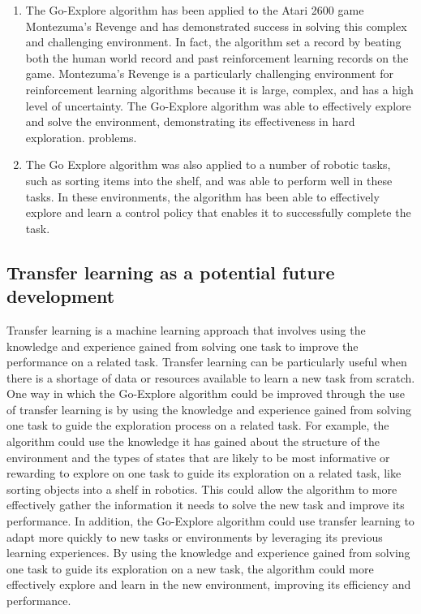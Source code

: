 \documentclass[runningheads]{llncs}%
\begin{document}
\begin{enumerate}
\item The Go-Explore algorithm has been applied to the Atari 2600 game Montezuma's Revenge and has demonstrated success in solving this complex and challenging environment. In fact, the algorithm set a record by beating both the human world record and past reinforcement learning records on the game. Montezuma's Revenge is a particularly challenging environment for reinforcement learning algorithms because it is large, complex, and has a high level of uncertainty. The Go-Explore algorithm was able to effectively explore and solve the environment, demonstrating its effectiveness in hard exploration. problems. 

\item The Go Explore algorithm was also applied to a number of robotic tasks, such as sorting items into the shelf, and was able to perform well in these tasks. In these environments, the algorithm has been able to effectively explore and learn a control policy that enables it to successfully complete the task.

\end{enumerate}

\subsection{ Transfer learning as a potential future development }
Transfer learning is a machine learning approach that involves using the knowledge and experience gained from solving one task to improve the performance on a related task. Transfer learning can be particularly useful when there is a shortage of data or resources available to learn a new task from scratch.\\

One way in which the Go-Explore algorithm could be improved through the use of transfer learning is by using the knowledge and experience gained from solving one task to guide the exploration process on a related task. For example, the algorithm could use the knowledge it has gained about the structure of the environment and the types of states that are likely to be most informative or rewarding to explore on one task to guide its exploration on a related task, like sorting objects into a shelf in robotics. This could allow the algorithm to more effectively gather the information it needs to solve the new task and improve its performance. In addition, the Go-Explore algorithm could use transfer learning to adapt more quickly to new tasks or environments by leveraging its previous learning experiences. By using the knowledge and experience gained from solving one task to guide its exploration on a new task, the algorithm could more effectively explore and learn in the new environment, improving its efficiency and performance.\\
\end{document}
